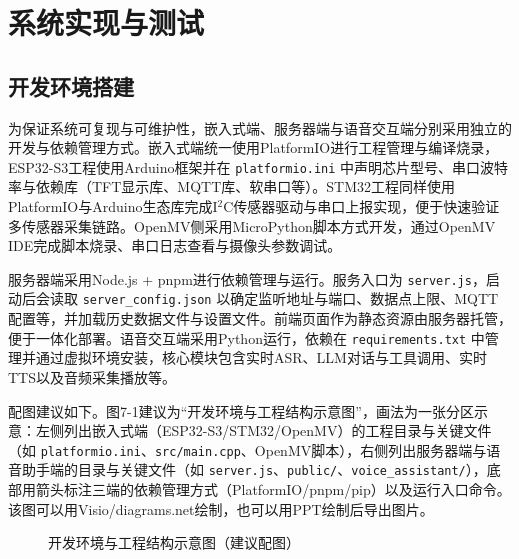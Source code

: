 
\section{系统实现与测试}

\subsection{开发环境搭建}
\par 为保证系统可复现与可维护性，嵌入式端、服务器端与语音交互端分别采用独立的开发与依赖管理方式。嵌入式端统一使用PlatformIO进行工程管理与编译烧录，ESP32-S3工程使用Arduino框架并在 \texttt{platformio.ini} 中声明芯片型号、串口波特率与依赖库（TFT显示库、MQTT库、软串口等）。STM32工程同样使用PlatformIO与Arduino生态库完成I\(^2\)C传感器驱动与串口上报实现，便于快速验证多传感器采集链路。OpenMV侧采用MicroPython脚本方式开发，通过OpenMV IDE完成脚本烧录、串口日志查看与摄像头参数调试。
\par 服务器端采用Node.js + pnpm进行依赖管理与运行。服务入口为 \texttt{server.js}，启动后会读取 \texttt{server\_config.json} 以确定监听地址与端口、数据点上限、MQTT配置等，并加载历史数据文件与设置文件。前端页面作为静态资源由服务器托管，便于一体化部署。语音交互端采用Python运行，依赖在 \texttt{requirements.txt} 中管理并通过虚拟环境安装，核心模块包含实时ASR、LLM对话与工具调用、实时TTS以及音频采集播放等。
\par 配图建议如下。图7-1建议为“开发环境与工程结构示意图”，画法为一张分区示意：左侧列出嵌入式端（ESP32-S3/STM32/OpenMV）的工程目录与关键文件（如 \texttt{platformio.ini}、\texttt{src/main.cpp}、OpenMV脚本），右侧列出服务器端与语音助手端的目录与关键文件（如 \texttt{server.js}、\texttt{public/}、\texttt{voice\_assistant/}），底部用箭头标注三端的依赖管理方式（PlatformIO/pnpm/pip）以及运行入口命令。该图可以用Visio/diagrams.net绘制，也可以用PPT绘制后导出图片。
\begin{figure}[H]
\centering
{}
\caption{开发环境与工程结构示意图（建议配图）}
\label{fig:dev_env_structure}
\end{figure}

